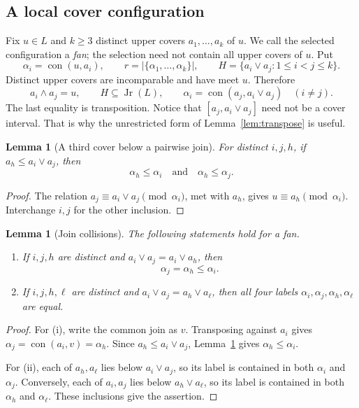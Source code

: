 \documentclass[11pt,a4paper]{article}
\numberwithin{equation}{section}
\newtheorem{lemma}[theorem]{Lemma}
\theoremstyle{definition}
\theoremstyle{remark}
\DeclareMathOperator{\con}{con}
\DeclareMathOperator{\Jr}{Jr}
\newcommand{\card}[1]{\lvert #1\rvert}
\begin{document}
\subsection{A local cover configuration}
Fix $u\in L$ and $k\ge3$ distinct upper covers $a_1,\ldots,a_k$ of $u$.
We call the selected configuration a \emph{fan}; the selection need not contain
all upper covers of $u$. Put
\begin{equation}\label{eq:fan-data}
 \alpha_i=\con(u,a_i),\qquad
 r=\card{\{\alpha_1,\ldots,\alpha_k\}},\qquad
 H=\{a_i\vee a_j:1\le i<j\le k\}.
\end{equation}
Distinct upper covers are incomparable and have meet $u$. Therefore
\begin{equation}\label{eq:pair-data}
 a_i\wedge a_j=u,\qquad H\subseteq\Jr(L),\qquad
 \alpha_i=\con(a_j,a_i\vee a_j)\quad(i\ne j).
\end{equation}
The last equality is transposition. Notice that
$[a_j,a_i\vee a_j]$ need not be a cover interval. That is why the unrestricted
form of Lemma~\ref{lem:transpose} is useful.

\begin{lemma}[A third cover below a pairwise join]\label{lem:support}
For distinct $i,j,h$, if $a_h\le a_i\vee a_j$, then
\begin{equation}\label{eq:support}
 \alpha_h\le\alpha_i\quad\text{and}\quad\alpha_h\le\alpha_j.
\end{equation}
\end{lemma}
\begin{proof}
The relation $a_j\equiv a_i\vee a_j\pmod{\alpha_i}$, met with $a_h$, gives
$u\equiv a_h\pmod{\alpha_i}$. Interchange $i,j$ for the other inclusion.
\end{proof}

\begin{lemma}[Join collisions]\label{lem:collision}
The following statements hold for a fan.
\begin{enumerate}[label=\textup{(\roman*)}]
\item If $i,j,h$ are distinct and $a_i\vee a_j=a_i\vee a_h$, then
\begin{equation}\label{eq:incident-collision}
 \alpha_j=\alpha_h\le\alpha_i.
\end{equation}
\item If $i,j,h,\ell$ are distinct and
$a_i\vee a_j=a_h\vee a_\ell$, then all four labels
$\alpha_i,\alpha_j,\alpha_h,\alpha_\ell$ are equal.
\end{enumerate}
\end{lemma}
\begin{proof}
For (i), write the common join as $v$. Transposing against $a_i$ gives
$\alpha_j=\con(a_i,v)=\alpha_h$.
Since $a_h\le a_i\vee a_j$, Lemma~\ref{lem:support} gives
$\alpha_h\le\alpha_i$.

For (ii), each of $a_h,a_\ell$ lies below $a_i\vee a_j$, so its label is
contained in both $\alpha_i$ and $\alpha_j$. Conversely, each of $a_i,a_j$
lies below $a_h\vee a_\ell$, so its label is contained in both
$\alpha_h$ and $\alpha_\ell$. These inclusions give the assertion.
\end{proof}
\end{document}
